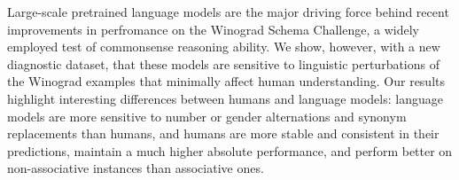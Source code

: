 Large-scale pretrained language models are the major driving force behind recent improvements in perfromance on the Winograd Schema Challenge, a widely employed test of commonsense reasoning ability. We show, however, with a new diagnostic dataset, that these models are sensitive to linguistic perturbations of the Winograd examples that minimally affect human understanding. Our results highlight interesting differences between humans and language models: language models are more sensitive to number or gender alternations and synonym replacements than humans, and humans are more stable and consistent in their predictions, maintain a much higher absolute performance, and perform better on non-associative instances than associative ones.
